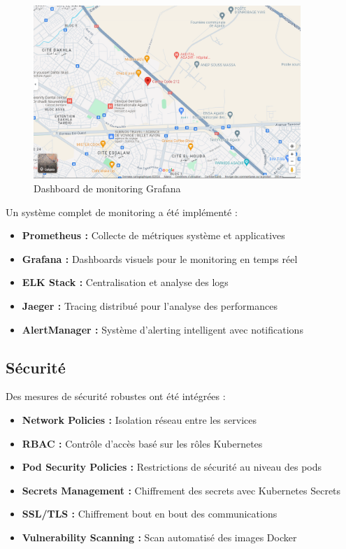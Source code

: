 \begin{figure}[H]
\centering
\includegraphics[width=0.9\textwidth]{assets/images/maps.png}
\caption{Dashboard de monitoring Grafana}
\label{fig:monitoring-dashboard}
\end{figure}

Un système complet de monitoring a été implémenté :

\begin{itemize}
    \item \textbf{Prometheus :} Collecte de métriques système et applicatives
    \item \textbf{Grafana :} Dashboards visuels pour le monitoring en temps réel
    \item \textbf{ELK Stack :} Centralisation et analyse des logs
    \item \textbf{Jaeger :} Tracing distribué pour l'analyse des performances
    \item \textbf{AlertManager :} Système d'alerting intelligent avec notifications
\end{itemize}

\subsection{Sécurité}

Des mesures de sécurité robustes ont été intégrées :

\begin{itemize}
    \item \textbf{Network Policies :} Isolation réseau entre les services
    \item \textbf{RBAC :} Contrôle d'accès basé sur les rôles Kubernetes
    \item \textbf{Pod Security Policies :} Restrictions de sécurité au niveau des pods
    \item \textbf{Secrets Management :} Chiffrement des secrets avec Kubernetes Secrets
    \item \textbf{SSL/TLS :} Chiffrement bout en bout des communications
    \item \textbf{Vulnerability Scanning :} Scan automatisé des images Docker
\end{itemize}

